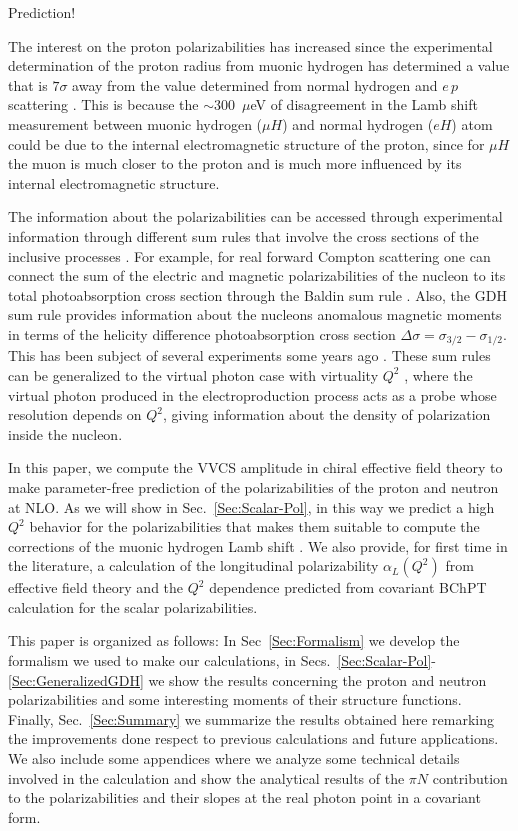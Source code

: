 \documentclass[prc,twocolumn,showpacs,preprintnumbers,amsmath,amssymb
,superscriptaddress,a4paper,nofootinbib
]{revtex4-1}
\begin{document}
Prediction!

The interest on the proton polarizabilities has increased since the experimental determination of the proton radius \cite{Pohl:2010zza} from muonic hydrogen has determined a value that is $7\sigma$ away from the value determined from normal hydrogen and $e\,p$ scattering \cite{Bernauer:2010wm} . This is because the $\sim 300$~$\mu$eV of disagreement in the Lamb shift measurement between muonic hydrogen ($\mu H$) and normal hydrogen ($eH$) atom could be due to the internal electromagnetic structure of the proton, since for $\mu H$ the muon is much closer to the proton and is much more influenced by its internal electromagnetic structure.

The information about the polarizabilities can be accessed through experimental information through different sum rules that involve the cross sections of the inclusive processes \cite{Drechsel:2002ar}. 
For example, for real forward Compton scattering one can connect the sum of the electric and magnetic polarizabilities of the nucleon to its total photoabsorption cross section through the Baldin sum rule \cite{BaldinSumRule}. Also, the GDH sum rule \cite{Gerasimov:1965et,Drell:1966jv} provides information about the nucleons anomalous magnetic moments in terms of the helicity difference photoabsorption cross section $\Delta\sigma=\sigma_{3/2}-\sigma_{1/2}$. This has been subject of several experiments some years ago \cite{Ahrens:2001qt, Helbing:2002eg}.
These sum rules can be generalized to the virtual photon case with virtuality $Q^2$ \cite{Drechsel:2002ar}, where the virtual photon produced in the electroproduction process acts as a probe whose resolution depends on $Q^2$, giving information about the density of polarization inside the nucleon.

In this paper, we compute the VVCS amplitude in chiral effective field theory to make parameter-free prediction of the polarizabilities of the proton and neutron at NLO. As we will show in Sec.~\ref{Sec:Scalar-Pol}, in this way we predict a high $Q^2$ behavior for the polarizabilities that makes them suitable to compute the corrections of the muonic hydrogen Lamb shift \cite{Alarcon:2013cba}. We also provide, for first time in the literature, a calculation of the longitudinal polarizability $\alpha_L(Q^2)$ from effective field theory and the $Q^2$ dependence predicted from covariant BChPT calculation for the scalar polarizabilities.

This paper is organized as follows: In Sec~\ref{Sec:Formalism} we develop the formalism we used to make our calculations, in Secs.~\ref{Sec:Scalar-Pol}-\ref{Sec:GeneralizedGDH} we show the results concerning the proton and neutron polarizabilities and some interesting moments of their structure functions. Finally,  Sec.~\ref{Sec:Summary} we summarize the results obtained here remarking the improvements done respect to previous calculations and future applications. We also include some appendices where we analyze some technical details involved in the calculation and show the analytical results of the $\pi N$ contribution to the polarizabilities and their slopes at the real photon point in a covariant form. 
\end{document}
